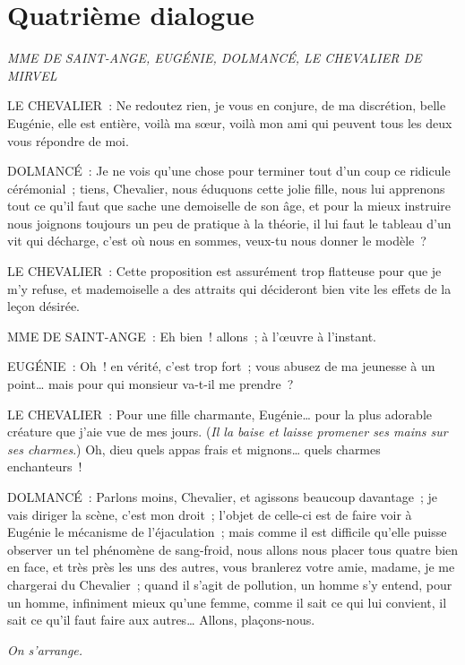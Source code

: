 \documentclass[french,twoside]{book} %
\begin{document}
\section[{Quatrième dialogue}]{Quatrième dialogue}
\label{d4}\renewcommand{\leftmark}{Quatrième dialogue}

\textit{MME DE SAINT-ANGE, EUGÉNIE, DOLMANCÉ, LE CHEVALIER DE MIRVEL}\par
\noindent LE CHEVALIER : Ne redoutez rien, je vous en conjure, de ma discrétion, belle Eugénie, elle est entière, voilà ma sœur, voilà mon ami qui peuvent tous les deux vous répondre de moi.\par
DOLMANCÉ : Je ne vois qu’une chose pour terminer tout d’un coup ce ridicule cérémonial ; tiens, Chevalier, nous éduquons cette jolie fille, nous lui apprenons tout ce qu’il faut que sache une demoiselle de son âge, et pour la mieux instruire nous joignons toujours un peu de pratique à la théorie, il lui faut le tableau d’un vit qui décharge, c’est où nous en sommes, veux-tu nous donner le modèle ?\par
LE CHEVALIER : Cette proposition est assurément trop flatteuse pour que je m’y refuse, et mademoiselle a des attraits qui décideront bien vite les effets de la leçon désirée.\par
MME DE SAINT-ANGE : Eh bien ! allons ; à l’œuvre à l’instant.\par
EUGÉNIE : Oh ! en vérité, c’est trop fort ; vous abusez de ma jeunesse à un point… mais pour qui monsieur va-t-il me prendre ?\par
LE CHEVALIER : Pour une fille charmante, Eugénie… pour la plus adorable créature que j’aie vue de mes jours. ({\itshape Il la baise et laisse promener ses mains sur ses charmes}.) Oh, dieu quels appas frais et mignons… quels charmes enchanteurs !\par
DOLMANCÉ : Parlons moins, Chevalier, et agissons beaucoup davantage ; je vais diriger la scène, c’est mon droit ; l’objet de celle-ci est de faire voir à Eugénie le mécanisme de l’éjaculation ; mais comme il est difficile qu’elle puisse observer un tel phénomène de sang-froid, nous allons nous placer tous quatre bien en face, et très près les uns des autres, vous branlerez votre amie, madame, je me chargerai du Chevalier ; quand il s’agit de pollution, un homme s’y entend, pour un homme, infiniment mieux qu’une femme, comme il sait ce qui lui convient, il sait ce qu’il faut faire aux autres… Allons, plaçons-nous.\par
{\itshape On s’arrange.}\par
\end{document}
